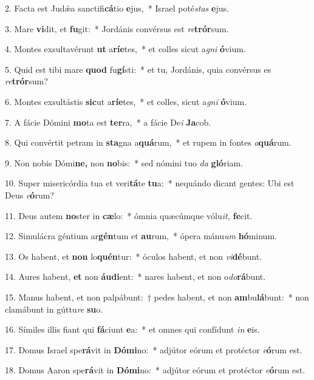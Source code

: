 \item 2. Facta est Judǽa sanctifi\textbf{cá}tio \textbf{e}jus,~* Israel poté\textit{stas} \textbf{e}jus.
\item 3. Mare \textbf{vi}dit, et \textbf{fu}git:~* Jordánis convérsus est \textit{re}\textbf{trór}sum.
\item 4. Montes exsultavérunt \textbf{ut} a\textbf{rí}\textbf{e}tes,~* et colles sicut a\textit{gni} \textbf{ó}vium.
\item 5. Quid est tibi mare \textbf{quod} fu\textbf{gí}sti:~* et tu, Jordánis, quia convérsus es \textit{re}\textbf{trór}sum?
\item 6. Montes exsultástis \textbf{sic}ut a\textbf{rí}\textbf{e}tes,~* et colles, sicut a\textit{gni} \textbf{ó}vium.
\item 7. A fácie Dómini \textbf{mo}ta est \textbf{ter}ra,~* a fácie De\textit{i} \textbf{Ja}cob.
\item 8. Qui convértit petram in \textbf{sta}gna a\textbf{quá}rum,~* et rupem in fontes \textit{a}\textbf{quá}rum.
\item 9. Non nobis Dómi\textbf{ne,} non \textbf{no}bis:~* sed nómini tuo \textit{da} \textbf{gló}riam.
\item 10. Super misericórdia tua et veri\textbf{tá}te \textbf{tu}a:~* nequándo dicant gentes: Ubi est Deus \textit{e}\textbf{ó}rum?
\item 11. Deus autem \textbf{no}ster in \textbf{cæ}lo:~* ómnia quæcúmque vólu\textit{it,} \textbf{fe}cit.
\item 12. Simulácra géntium ar\textbf{gén}tum et \textbf{au}rum,~* ópera mánu\hspace{0.03em}\textit{um} \textbf{hó}minum.
\item 13. Os habent, et \textbf{non} lo\textbf{quén}tur:~* óculos habent, et non \textit{vi}\textbf{dé}bunt.
\item 14. Aures habent, \textbf{et} non \textbf{áu}\textbf{di}ent:~* nares habent, et non o\textit{do}\textbf{rá}bunt.
\item 15. Manus habent, et non palpábunt:~† pedes habent, et non \textbf{am}bu\textbf{lá}bunt:~* non clamábunt in gúttu\textit{re} \textbf{su}o.
\item 16. Símiles illis fiant qui \textbf{fá}ciunt \textbf{e}a:~* et omnes qui confídunt \textit{in} \textbf{e}is.
\item 17. Domus Israel spe\textbf{rá}vit in \textbf{Dó}\textbf{mi}no:~* adjútor eórum et protéctor \textit{e}\textbf{ó}rum est.
\item 18. Domus Aaron spe\textbf{rá}vit in \textbf{Dó}\textbf{mi}no:~* adjútor eórum et protéctor \textit{e}\textbf{ó}rum est.
